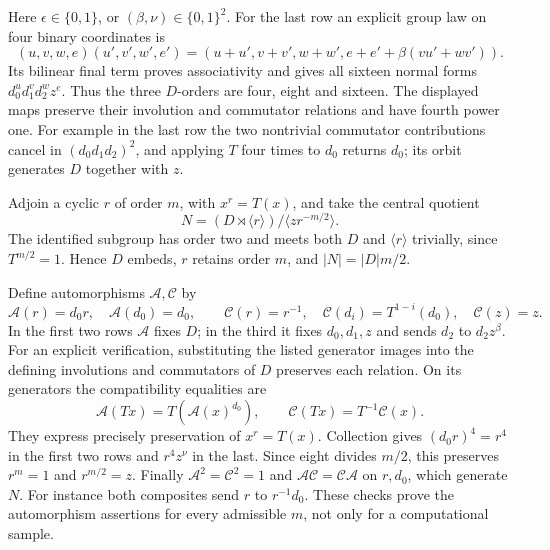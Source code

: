 \documentclass[
  11pt,
  a4paper,
]{article}
\begin{document}
Here \(\epsilon\in\{0,1\}\), or \((\beta,\nu)\in\{0,1\}^2\). For the
last row an explicit group law on four binary coordinates is \[
 (u,v,w,e)(u',v',w',e')=
 (u+u',v+v',w+w',e+e'+\beta(vu'+wv')).                    \tag{A-C2}
\] Its bilinear final term proves associativity and gives all sixteen
normal forms \(d_0^u d_1^v d_2^w z^e\). Thus the three \(D\)-orders are
four, eight and sixteen. The displayed maps preserve their involution
and commutator relations and have fourth power one. For example in the
last row the two nontrivial commutator contributions cancel in
\((d_0d_1d_2)^2\), and applying \(T\) four times to \(d_0\) returns
\(d_0\); its orbit generates \(D\) together with \(z\).

Adjoin a cyclic \(r\) of order \(m\), with \(x^r=T(x)\), and take the
central quotient \[
 N=(D\rtimes\langle r\rangle)/\langle zr^{-m/2}\rangle.       \tag{A-C3}
\] The identified subgroup has order two and meets both \(D\) and
\(\langle r\rangle\) trivially, since \(T^{m/2}=1\). Hence \(D\) embeds,
\(r\) retains order \(m\), and \(|N|=|D|m/2\).

Define automorphisms \(\mathcal A,\mathcal C\) by \[
 \mathcal A(r)=d_0r,\quad \mathcal A(d_0)=d_0,\qquad
 \mathcal C(r)=r^{-1},\quad
 \mathcal C(d_i)=T^{1-i}(d_0),\quad\mathcal C(z)=z.
\] In the first two rows \(\mathcal A\) fixes \(D\); in the third it
fixes \(d_0,d_1,z\) and sends \(d_2\) to \(d_2z^\beta\). For an explicit
verification, substituting the listed generator images into the defining
involutions and commutators of \(D\) preserves each relation. On its
generators the compatibility equalities are \[
 \mathcal A(Tx)=T(\mathcal A(x)^{d_0}),\qquad
 \mathcal C(Tx)=T^{-1}\mathcal C(x).
\] They express precisely preservation of \(x^r=T(x)\). Collection gives
\((d_0r)^4=r^4\) in the first two rows and \(r^4z^\nu\) in the last.
Since eight divides \(m/2\), this preserves \(r^m=1\) and \(r^{m/2}=z\).
Finally \(\mathcal A^2=\mathcal C^2=1\) and
\(\mathcal A\mathcal C=\mathcal C\mathcal A\) on \(r,d_0\), which
generate \(N\). For instance both composites send \(r\) to
\(r^{-1}d_0\). These checks prove the automorphism assertions for every
admissible \(m\), not only for a computational sample.
\end{document}
